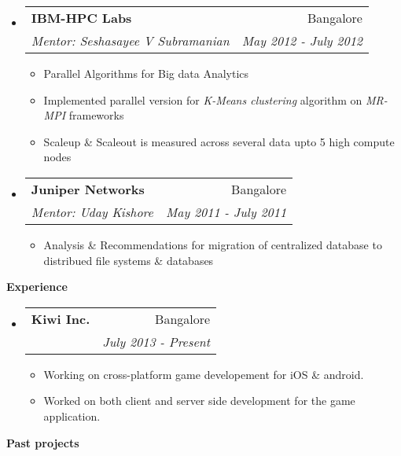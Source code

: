 \documentclass[letterpaper,11pt]{article}
\makeatletter
\newcommand{\resitem}[1]{\item #1 \vspace{-2pt}}
\newcommand{\resheading}[1]{{\large \colorbox{mygrey}{\begin{minipage}{\textwidth}{\textbf{#1 \vphantom{p\^{E}}}}\end{minipage}}}}
\newcommand{\ressubheading}[4]{
\begin{tabular*}{6.5in}{l@{\extracolsep{\fill}}r}
		\textbf{#1} & #2 \\
		\textit{#3} & \textit{#4} \\
\end{tabular*}\vspace{-6pt}}
\makeatother
\begin{document}
\begin{itemize}
		\item
			\ressubheading{{IBM-HPC Labs}}{Bangalore}{Mentor: Seshasayee V Subramanian}{May 2012 - July 2012}
				{\footnotesize
				\begin{itemize}
					\resitem{Parallel Algorithms for Big data Analytics}
					\resitem{Implemented parallel version for \emph{K-Means clustering} algorithm on \emph{MR-MPI} frameworks}
					\resitem{Scaleup \& Scaleout is measured across several data upto 5 high compute nodes}
				\end{itemize}
				}
		\item 
			\ressubheading{{Juniper Networks}}{Bangalore}{Mentor: Uday Kishore}{May 2011 - July 2011}
				{ \footnotesize
				\begin{itemize}
					\resitem{Analysis \& Recommendations for migration of centralized database to distribued file systems \& databases}
				\end{itemize}
				}

\end{itemize}
\resheading{Experience}
\begin{itemize}
	\item
		\ressubheading{{Kiwi Inc.}}{Bangalore}{}{July 2013 - Present}
		{\footnotesize
			\begin{itemize}
				\resitem{Working on cross-platform game developement for iOS \& android.}
				\resitem{Worked on both client and server side development for the game application.}
			\end{itemize}
		}
\end{itemize}
\resheading{Past projects}
\end{document}
